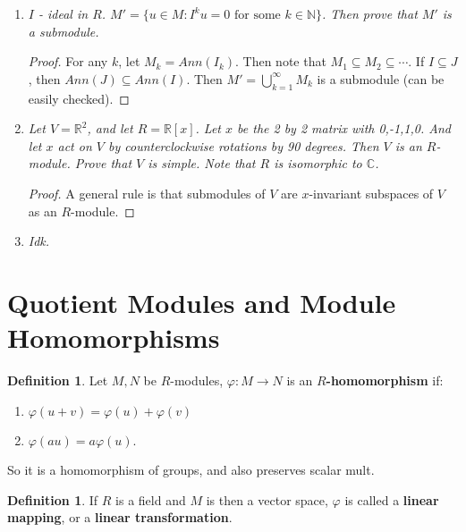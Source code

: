 \documentclass[12pt]{amsbook}
\theoremstyle{plain}
\numberwithin{section}{chapter}
\numberwithin{equation}{chapter}
\theoremstyle{definition}
\newtheorem{Def}[theorem]{Definition}
\theoremstyle{remark}
\newcommand{\sub}{\subseteq}
\newcommand{\R}{\mathbb{R}}
\newcommand{\n}{\mathbb{N}}
\renewcommand{\phi}{\varphi}
\begin{document}
\begin{enumerate}[label=\arabic*.]
\begin{enumerate}
\end{enumerate}

\item \textit{$I$ - ideal in $R$. $M' = \{u \in M: I^ku = 0 \text{ for some }k \in \n\}$. Then prove that $M'$ is a submodule. }

\begin{proof}
For any $k$, let $M_k = Ann(I_k)$. Then note that $M_1 \sub M_2 \sub \cdots$. If $I \sub J$, then $Ann(J) \sub Ann(I)$. Then $M' = \bigcup_{k = 1}^\infty M_k$ is a submodule (can be easily checked). 
\end{proof}

\setcounter{enumi}{17}

\item \textit{Let $V = \R^2$, and let $R = \R[x]$. Let $x$ be the 2 by 2 matrix with 0,-1,1,0. And let $x$ act on $V$ by counterclockwise rotations by 90 degrees. Then $V$ is an $R$-module. Prove that $V$ is simple. Note that $R$ is isomorphic to $\mathbb{C}$. }

\begin{proof}
A general rule is that submodules of $V$ are $x$-invariant subspaces of $V$ as an $R$-module. 
\end{proof}

\item \textit{Idk.}











\end{enumerate}



\section{Quotient Modules and Module Homomorphisms}

\begin{Def}
Let $M,N$ be $R$-modules, $\phi:M\to N$ is an \textbf{$R$-homomorphism} if: 
\begin{enumerate}
\item $\phi(u + v) = \phi(u) + \phi(v)$
\item $\phi(au) = a\phi(u)$.
\end{enumerate}
\end{Def}
So it is a homomorphism of groups, and also preserves scalar mult. 
\begin{Def}
If $R$ is a field and $M$ is then a vector space, $\phi$ is called a \textbf{linear mapping}, or a \textbf{linear transformation}. 
\end{Def}
\end{document}
